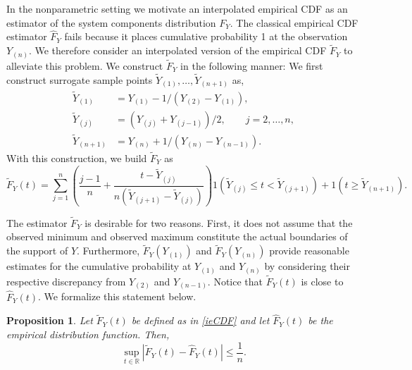 \documentclass[11pt]{article}
\newcommand{\R}{\mathbb{R}}
\newcommand{\nsys}{n}
\newtheorem{prop}{Proposition}
\begin{document}
In the nonparametric setting we motivate an interpolated empirical CDF as an estimator of the system components distribution $F_Y$. The classical empirical CDF estimator $\widehat F_Y$ fails because it places cumulative probability 1 at the observation $Y_{(\nsys)}$. We therefore consider an interpolated version of the empirical CDF $\widetilde F_Y$ to alleviate this problem. We construct $\widetilde F_Y$ in the following manner: We first construct surrogate sample points $\widetilde Y_{(1)}, \ldots, \widetilde Y_{(\nsys+1)}$ as, 
\begin{align*}
  \widetilde Y_{(1)} &= Y_{(1)} - 1/(Y_{(2)} - Y_{(1)}), \\
  \widetilde Y_{(j)} &= (Y_{(j)} + Y_{(j-1)})/2, \qquad j = 2,\ldots, \nsys, \\
  \widetilde Y_{(\nsys + 1)} &= Y_{(\nsys)} + 1/(Y_{(\nsys)} - Y_{(\nsys-1)}).
\end{align*}
With this construction, we build $\widetilde F_Y$ as
\begin{equation} \label{ieCDF}
  \widetilde F_Y(t) = \sum_{j=1}^{\nsys} \left(\frac{j-1}{\nsys} 
    + \frac{t - \widetilde Y_{(j)}}
      {\nsys(\widetilde Y_{(j+1)} - \widetilde Y_{(j)})}\right)
    1\left(\widetilde Y_{(j)} \leq t < \widetilde Y_{(j+1)}\right) 
    + 1(t \geq \widetilde Y_{(\nsys + 1)}).
\end{equation}

The estimator $\widetilde F_Y$ is desirable for two reasons. First, it does not assume that the observed minimum and observed maximum constitute the actual boundaries of the support of $Y$. Furthermore, $\widetilde F_Y(Y_{(1)})$ and $\widetilde F_Y(Y_{(\nsys)})$ provide reasonable estimates for the cumulative probability at $Y_{(1)}$ and $Y_{(\nsys)}$ by considering their respective discrepancy from $Y_{(2)}$ and $Y_{(\nsys-1)}$. %
Notice that $\widetilde F_Y(t)$ is close to $\widehat F_Y(t)$. We formalize this statement below.

\begin{prop} \label{prop-ieCDF}
Let $\widetilde F_Y(t)$ be defined as in \eqref{ieCDF} and let $\widehat F_Y(t)$ be the empirical distribution function. Then,
$$
  \sup_{t \in \R}|\widetilde F_Y(t) - \widehat F_Y(t)| \leq \frac{1}{\nsys}.
$$
\end{prop}
\end{document}
